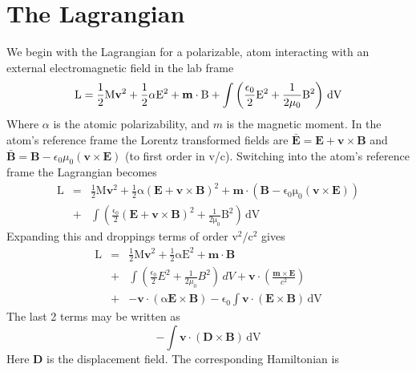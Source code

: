 \documentclass[twocolumn,english,pra,aps,superscriptaddress,floatfix]{revtex4-1}
\begin{document}
\section{The Lagrangian}
\label{sec:Lagrange}

We begin with the Lagrangian for a polarizable, atom interacting with an external electromagnetic field in the lab frame \cite{wei95}
\begin{equation}
\mathrm{L=\frac{1}{2}\mathrm{M}\mathbf{v}^2 + \frac{1}{2}\alpha E^2+\mathbf{m} \cdot B +\int\left(\frac{\epsilon_0}{2}E^2+ \frac{1}{2\mu_0}B^2\right)\,dV} \nonumber \\
\label{lagrangian1}
\end{equation}
Where $\alpha$ is the atomic polarizability, and $m$ is the magnetic moment.  In the atom's reference frame the Lorentz transformed fields are $\bar{\mathbf{E}}=\mathbf{E}+\mathbf{v}\times\mathbf{B}$ and $\bar{\mathbf{B}}=\mathbf{B}-\epsilon_0\mu_0\left(\mathbf{v}\times\mathbf{E}\right)$ (to first order in v/c). Switching into the atom's reference frame the Lagrangian becomes
\begin{eqnarray}
\mathrm{L}&=&\mathrm{\frac{1}{2}\mathrm{M}\mathbf{v}^2 + \frac{1}{2}\alpha\left(\mathbf{E}+\mathbf{v}\times\mathbf{B}\right)^2 +\mathbf{m}\cdot\left(\mathbf{B}-\epsilon_0\mu_0\left(\mathbf{v}\times\mathbf{E}\right)\right) } \nonumber \\
&+&\mathrm{\int\left(\frac{\epsilon_0}{2}\left(\mathbf{E}+\mathbf{v}\times\mathbf{B}\right)^2+ \frac{1}{2\mu_0}B^2\right)\,dV} 
\label{lagrangian2}
\end{eqnarray}
Expanding this and droppings terms of order $\mathrm{v^2/c^2}$ gives
\begin{eqnarray}
\mathrm{L}&=&\mathrm{\frac{1}{2}\mathrm{M}\mathbf{v}^2 + \frac{1}{2}\alpha E^2 +\mathbf{m}\cdot\mathbf{B}}\nonumber \\
&+&{\int\left(\frac{\epsilon_0}{2}E^2+ \frac{1}{2\mu_0}B^2\right)\,dV+\mathbf{v}\cdot\left(\frac{\mathbf{m}\times\mathbf{E}}{c^2}\right)} \nonumber \\
&+&\mathrm{-\mathbf{v}\cdot\left(\alpha\mathbf{E}\times\mathbf{B}\right)-\epsilon_0\int\mathbf{v}\cdot\left(\mathbf{E}\times\mathbf{B}\right)\,dV} 
\label{lagrangian3}
\end{eqnarray}
The last 2 terms may be written as
\begin{equation}
\mathrm{-\int\mathbf{v}\cdot\left(\mathbf{D}\times\mathbf{B}\right)\,dV}
\end{equation}
Here $\mathbf{D}$ is the displacement field. The corresponding Hamiltonian is
\end{document}
